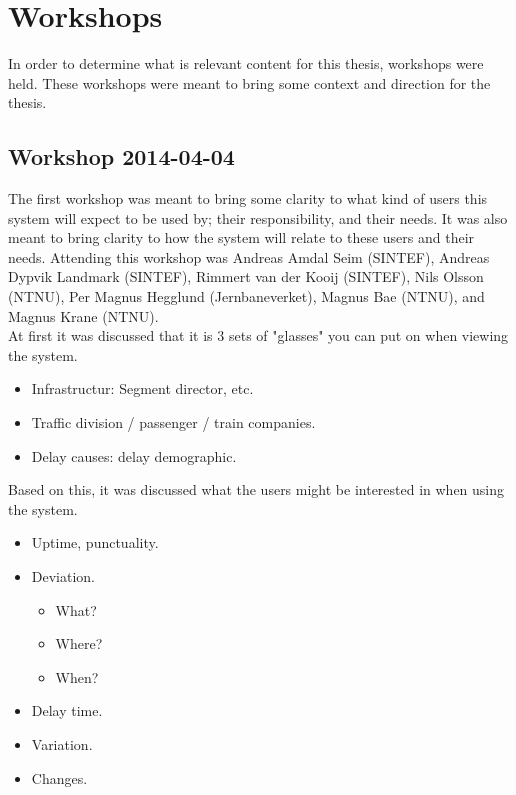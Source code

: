 
\section{Workshops} %
\label{sec:workshops}
In order to determine what is relevant content for this thesis, workshops were
held. These workshops were meant to bring some context and direction for the
thesis. 

\subsection{Workshop 2014-04-04} %
\label{sub:workshop_2014_04_04}
The first workshop was meant to bring some clarity to what kind of users this
system will expect to be used by; their responsibility, and their needs.
It was also meant to bring clarity to how the system will relate to these users and their needs.
Attending this workshop was Andreas Amdal Seim (SINTEF), Andreas Dypvik 
Landmark (SINTEF), Rimmert van der Kooij (SINTEF), Nils Olsson (NTNU), Per 
Magnus Hegglund (Jernbaneverket), Magnus Bae (NTNU), and Magnus Krane (NTNU).\\

At first it was discussed that it is 3 sets of "glasses" you can put on when
viewing the system.
\begin{itemize}
	\item Infrastructur: Segment director, etc.
	\item Traffic division / passenger / train companies.
	\item Delay causes: delay demographic.
\end{itemize}

Based on this, it was discussed what the users might be interested in when
using the system.
\begin{itemize}
	\item Uptime, punctuality.
	\item Deviation.
	\begin{itemize}
		\item What?
		\item Where?
		\item When?
	\end{itemize}
	\item Delay time.
	\item Variation.
	\item Changes.
\end{itemize}

